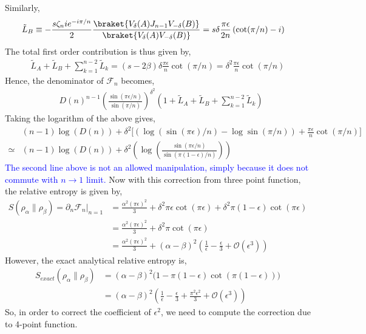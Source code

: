 \documentclass[11pt]{article}
\newcommand{\ep}{\epsilon}
\newcommand{\p}{\partial}
\newcommand{\mO}{\mathcal{O}}
\newcommand{\nn}{\nonumber}
\newcommand{\lb}{\left(}
\newcommand{\rb}{\right)}
\newcommand{\NL}[1]{\textcolor{blue}{#1}}
\begin{document}
Similarly,
\begin{align}
    \tilde{L}_B &\equiv -\frac{s\zeta_ni e^{-i\pi/n}}{2}\frac{\braket{V_\delta(A)J_{n-1}V_{-\delta}(B)}}{\braket{V_{\delta}(A)V_{-\delta}(B)}} = s\delta\frac{\pi \ep}{2n}\lb\cot(\pi/n) -i\rb
\end{align}
The total first order contribution is thus given by,
\begin{align}
    \tilde{L}_A + \tilde{L}_B + \sum_{k=1}^{n-2}\tilde{L}_k = (s-2\beta)\delta \frac{\pi \ep}{n}\cot(\pi/n) = \delta^2 \frac{\pi \ep}{n}\cot(\pi/n)
\end{align}
Hence, the denominator of $\mathcal{F}_n$ becomes,
\begin{align}
   &D(n)^{n-1} \lb \frac{\sin (\pi \ep/n)}{\sin(\pi/n)}\rb^{\delta^2} \lb 1+ \tilde{L}_A + \tilde{L}_B + \sum_{k=1}^{n-2}\tilde{L}_k \rb
\end{align}
Taking the logarithm of the above gives,
\begin{align}
    &(n-1)\log(D(n)) + \delta^2 \Bigg[ \lb \log (\sin (\pi \ep)/n) -  \log\sin(\pi/n)\rb + \frac{\pi \ep}{n} \cot(\pi /n) 
    \Bigg] \\
    \simeq &(n-1)\log(D(n)) + \delta^2 \lb \log \lb\frac{\sin(\pi\ep/n)}{\sin(\pi (1-\ep)/n)}\rb \rb
\end{align}
\NL{The second line above is not an allowed manipulation, simply because it does not commute with $n\to 1$ limit.}
Now with this correction from three point function, the relative entropy is given by, 
\begin{align}
    S(\rho_\alpha \| \rho_\beta) = \p_n \mathcal{F}_n|_{n=1} &= \frac{\alpha ^2 \lb \pi \ep \rb^2 }{3} + \delta^2 \pi \ep \cot(\pi \ep) + \delta^2 \pi (1-\ep) \cot (\pi \ep) \\
    &= \frac{\alpha ^2 \lb \pi \ep \rb^2 }{3} + \delta^2 \pi \cot(\pi \ep)\nn\\
    &= \frac{\alpha^2 (\pi \ep)^2}{3} + (\alpha - \beta)^2 \lb\frac{1}{\ep} - \frac{\ep}{3} + \mO(\ep^3)\rb
\end{align}
However, the exact analytical relative entropy is,
\begin{align}
    S_{exact}(\rho_\alpha \| \rho_\beta) &= (\alpha - \beta)^2 \Big(1- \pi (1-\ep)\cot(\pi (1-\ep))\Big) \\
    &= (\alpha - \beta)^2 \lb \frac{1}{\ep} - \frac{\ep}{3} + \frac{\pi ^2 \ep^2}{3} + \mO(\ep^3)\rb
\end{align}
So, in order to correct the coefficient of $\ep^2$, we need to compute the correction due to 4-point function. 
\end{document}
